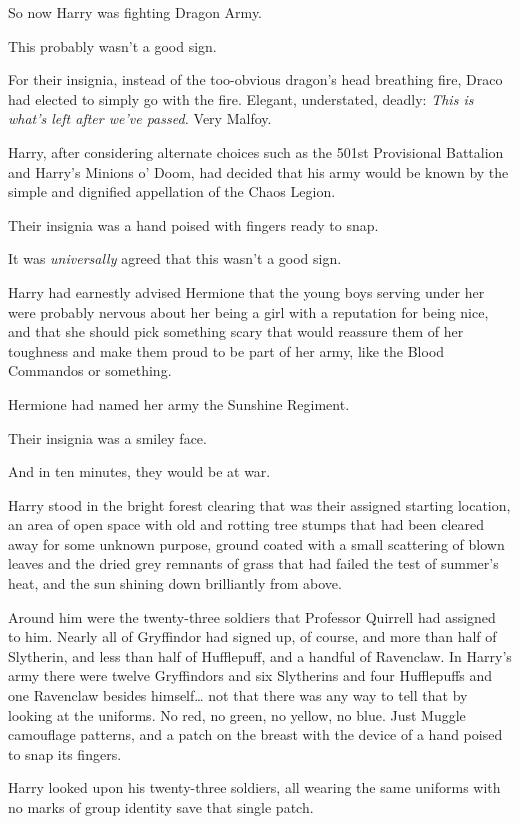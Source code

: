 So now Harry was fighting Dragon Army.

This probably wasn't a good sign.

For their insignia, instead of the too-obvious dragon's head breathing
fire, Draco had elected to simply go with the fire. Elegant,
understated, deadly: \emph{This is what's left after we've passed.} Very
Malfoy.

Harry, after considering alternate choices such as the 501st Provisional
Battalion and Harry's Minions o' Doom, had decided that his army would
be known by the simple and dignified appellation of the Chaos Legion.

Their insignia was a hand poised with fingers ready to snap.

It was \emph{universally} agreed that this wasn't a good sign.

Harry had earnestly advised Hermione that the young boys serving under
her were probably nervous about her being a girl with a reputation for
being nice, and that she should pick something scary that would reassure
them of her toughness and make them proud to be part of her army, like
the Blood Commandos or something.

Hermione had named her army the Sunshine Regiment.

Their insignia was a smiley face.

And in ten minutes, they would be at war.

Harry stood in the bright forest clearing that was their assigned
starting location, an area of open space with old and rotting tree
stumps that had been cleared away for some unknown purpose, ground
coated with a small scattering of blown leaves and the dried grey
remnants of grass that had failed the test of summer's heat, and the sun
shining down brilliantly from above.

Around him were the twenty-three soldiers that Professor Quirrell had
assigned to him. Nearly all of Gryffindor had signed up, of course, and
more than half of Slytherin, and less than half of Hufflepuff, and a
handful of Ravenclaw. In Harry's army there were twelve Gryffindors and
six Slytherins and four Hufflepuffs and one Ravenclaw besides
himself\ldots{} not that there was any way to tell that by looking at
the uniforms. No red, no green, no yellow, no blue. Just Muggle
camouflage patterns, and a patch on the breast with the device of a hand
poised to snap its fingers.

Harry looked upon his twenty-three soldiers, all wearing the same
uniforms with no marks of group identity save that single patch.

